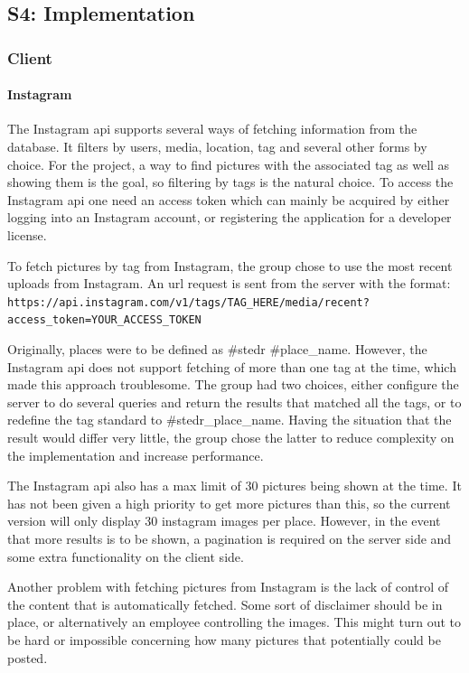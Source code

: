 \documentclass[11pt]{book}
\begin{document}
\subsection{S4: Implementation}

\subsubsection{Client}
\paragraph{Instagram}
The Instagram \gls{api} supports several ways of fetching information from the database. It filters by users, media, location, tag and several other forms by choice. For the project, a way to find pictures with the associated tag as well as showing them is the goal, so filtering by tags is the natural choice. To access the Instagram \gls{api} one need an access token which can mainly be acquired by either logging into an Instagram account, or registering the application for a developer license. 

To fetch pictures by tag from Instagram, the group chose to use the most recent uploads from Instagram. An \gls{url} request is sent from the server with the format:
\texttt{https://api.instagram.com/v1/tags/TAG\_HERE/media/recent?access\_token=YOUR\_ACCESS\_TOKEN}

Originally, places were to be defined as \#stedr \#place\_name. However, the Instagram \gls{api} does not support fetching of more than one tag at the time, which made this approach troublesome. The group had two choices, either configure the server to do several queries and return the results that matched all the tags, or to redefine the tag standard to \#stedr\_place\_name. Having the situation that the result would differ very little, the group chose the latter to reduce complexity on the implementation and increase performance. 

The Instagram \gls{api} also has a max limit of 30 pictures being shown at the time. It has not been given a high priority to get more pictures than this, so the current version will only display 30 instagram images per place. However, in the event that more results is to be shown, a pagination is required on the server side and some extra functionality on the client side.

Another problem with fetching pictures from Instagram is the lack of control of the content that is automatically fetched. Some sort of disclaimer should be in place, or alternatively an employee controlling the images. This might turn out to be hard or impossible concerning how many pictures that potentially could be posted.
\end{document}
